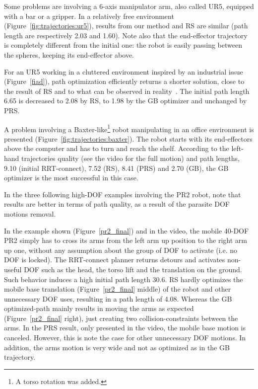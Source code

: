 \documentclass{tADR2e}
\begin{document}
Some problems are 
involving a 6-axis manipulator arm, also called UR5, equipped with a bar or a 
gripper.
In a relatively free environment (Figure~\ref{fig:trajectories:ur5}), 
results from our method and RS are similar (path length are respectively 2.03 and 1.60). 
Note also that the end-effector trajectory is completely different from the initial 
one: the robot is easily passing between the spheres, keeping its end-effector 
above.

For an UR5 working in a cluttered environment inspired by an industrial issue 
(Figure~\ref{fiad}), path optimization efficiently returns a shorter solution, close 
to the result of RS and to what can be observed in reality~\cite{factory-day-video}. 
The initial path length 6.65 is decreased to 2.08 by RS, to 
1.98 by the GB optimizer and unchanged by PRS.

A problem involving a Baxter-like\footnote{A torso rotation was added.} robot 
manipulating in an office environment is presented 
(Figure~\ref{fig:trajectories:baxter}). The robot starts with its end-effectors 
above the computer and has to 
turn and reach the shelf. According to the left-hand trajectories quality (see the 
video for the full motion) and path lengths, 9.10 (initial RRT-connect), 7.52 (RS), 
8.41 (PRS) and 2.70 (GB), the GB optimizer is the most successful in this case.

\vspace{0.4cm}

In the three following high-DOF examples involving the PR2 robot, note that 
results are better in terms of path quality, as a result of the parasite 
DOF motions removal.

In the example shown (Figure~\ref{pr2_final}) and in the video, the mobile 
40-DOF PR2 simply has to cross its arms from 
the left arm up position to the right arm up one, without any assumption about the group of DOF to activate (i.e. no DOF is locked). 
The RRT-connect planner 
returns detours and activates non-useful DOF such as the head, the torso lift 
and the translation on the ground. Such behavior induces a high initial path length 
30.6. RS hardly optimizes the mobile base 
translation (Figure~\ref{pr2_final} middle) of the robot and other unnecessary DOF 
uses, resulting in a path length of 4.08.
Whereas the GB optimized-path mainly 
results in moving the arms as expected (Figure~\ref{pr2_final} right), just creating 
two collision-constraints between the arms. In the PRS 
result, only presented in the video, the mobile base motion is canceled. However, this is note the case for other unnecessary DOF motions. In addition, the arms motion is very wide and not as optimized as in the GB trajectory.
\end{document}
